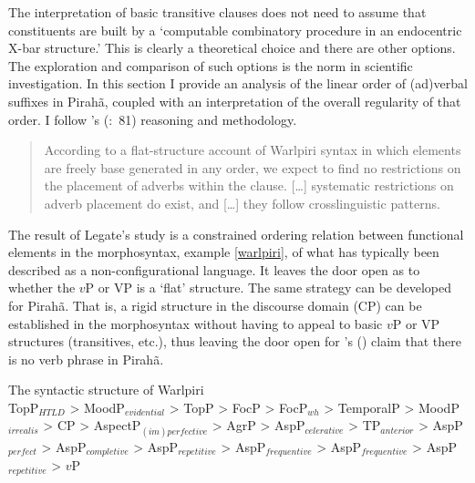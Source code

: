 \documentclass[11pt]{article}
\newcommand{\posscitet}[1]{\citeauthor{#1}'s (\citeyear{#1})}
\newcommand{\pgposscitet}[2]{\citeauthor{#1}'s (\citeyear{#1}:~#2)}
\begin{document}
The interpretation of basic transitive clauses does not need to assume that constituents are built by a `computable combinatory procedure in an endocentric X-bar structure.' This is clearly a theoretical choice and there are other options. The exploration and comparison of such options is the norm in scientific investigation. In this section I provide an analysis of the linear order of (ad)verbal suffixes in Pirah\~a, coupled with an interpretation of the overall regularity of that order. I follow \pgposscitet{legate01config}{81} reasoning and methodology. 

\begin{quote}
According to a flat-structure account of Warlpiri syntax in which elements are freely base generated in any order, we expect to find no restrictions on the placement of adverbs within the clause. [\dots] systematic restrictions on adverb placement do exist, and [\ldots] they follow crosslinguistic patterns.
\end{quote}

The result of Legate's study is a constrained ordering relation between functional elements in the morphosyntax, example \ref{warlpiri}, of what has typically been described as a non-configurational language. It leaves the door open as to whether the $v$P or VP is a `flat' structure. The same strategy can be developed for Pirah\~a. That is, a rigid structure in the discourse domain (CP) can be established in the morphosyntax without having to appeal to basic $v$P or VP structures (transitives, etc.), thus leaving the door open for \posscitet{everett09response} claim that there is no verb phrase in Pirah\~a.

\begin{exe}
\ex The syntactic structure of Warlpiri\label{warlpiri}\\
TopP$_{HTLD}$ \textgreater{} MoodP$_{evidential}$ \textgreater{} TopP \textgreater{} FocP \textgreater{} FocP$_{wh}$ \textgreater{} TemporalP \textgreater{}
MoodP$_{irrealis}$ \textgreater{} CP \textgreater{} AspectP$_{(im)perfective}$ \textgreater{} AgrP \textgreater{} AspP$_{celerative}$ \textgreater{} TP$_{anterior}$
\textgreater{} AspP$_{perfect}$ \textgreater{} AspP$_{completive}$ \textgreater{} AspP$_{repetitive}$ \textgreater{} AspP$_{frequentive}$ \textgreater{}
AspP$_{frequentive}$ \textgreater{} AspP$_{repetitive}$ \textgreater{} $v$P 
\end{exe}
\end{document}
